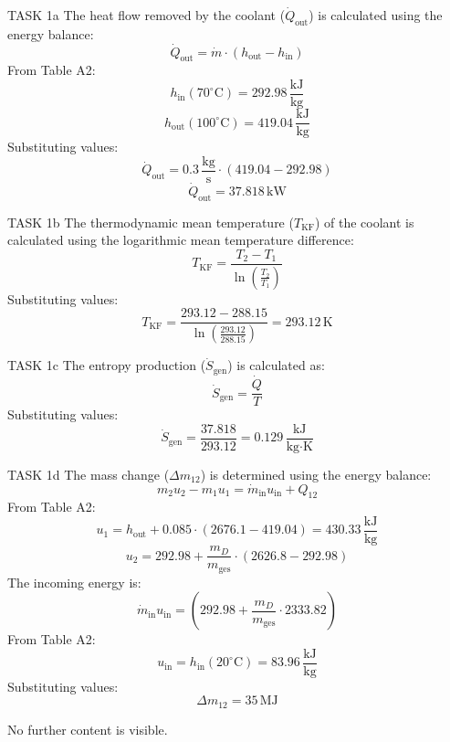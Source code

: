 TASK 1a  
The heat flow removed by the coolant (\( \dot{Q}_{\text{out}} \)) is calculated using the energy balance:  
\[
\dot{Q}_{\text{out}} = \dot{m} \cdot (h_{\text{out}} - h_{\text{in}})
\]  
From Table A2:  
\[
h_{\text{in}}(70^\circ\text{C}) = 292.98 \, \frac{\text{kJ}}{\text{kg}}
\]  
\[
h_{\text{out}}(100^\circ\text{C}) = 419.04 \, \frac{\text{kJ}}{\text{kg}}
\]  
Substituting values:  
\[
\dot{Q}_{\text{out}} = 0.3 \, \frac{\text{kg}}{\text{s}} \cdot (419.04 - 292.98)
\]  
\[
\dot{Q}_{\text{out}} = 37.818 \, \text{kW}
\]  

TASK 1b  
The thermodynamic mean temperature (\( T_{\text{KF}} \)) of the coolant is calculated using the logarithmic mean temperature difference:  
\[
T_{\text{KF}} = \frac{T_2 - T_1}{\ln\left(\frac{T_2}{T_1}\right)}
\]  
Substituting values:  
\[
T_{\text{KF}} = \frac{293.12 - 288.15}{\ln\left(\frac{293.12}{288.15}\right)} = 293.12 \, \text{K}
\]  

TASK 1c  
The entropy production (\( \dot{S}_{\text{gen}} \)) is calculated as:  
\[
\dot{S}_{\text{gen}} = \frac{\dot{Q}}{T}
\]  
Substituting values:  
\[
\dot{S}_{\text{gen}} = \frac{37.818}{293.12} = 0.129 \, \frac{\text{kJ}}{\text{kg·K}}
\]  

TASK 1d  
The mass change (\( \Delta m_{12} \)) is determined using the energy balance:  
\[
m_2 u_2 - m_1 u_1 = \dot{m}_{\text{in}} u_{\text{in}} + Q_{12}
\]  
From Table A2:  
\[
u_1 = h_{\text{out}} + 0.085 \cdot (2676.1 - 419.04) = 430.33 \, \frac{\text{kJ}}{\text{kg}}
\]  
\[
u_2 = 292.98 + \frac{m_D}{m_{\text{ges}}} \cdot (2626.8 - 292.98)
\]  
The incoming energy is:  
\[
\dot{m}_{\text{in}} u_{\text{in}} = (292.98 + \frac{m_D}{m_{\text{ges}}} \cdot 2333.82)
\]  
From Table A2:  
\[
u_{\text{in}} = h_{\text{in}}(20^\circ\text{C}) = 83.96 \, \frac{\text{kJ}}{\text{kg}}
\]  
Substituting values:  
\[
\Delta m_{12} = 35 \, \text{MJ}
\]  

No further content is visible.